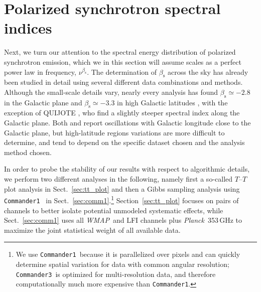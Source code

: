 \documentclass[twocolumn]{../../common/aa}
\def\WMAP{\emph{WMAP}}
\def\Planck{\emph{Planck}}
\def\commanderone{\texttt{Commander1}}
\def\commanderthree{\texttt{Commander3}}
\begin{document}
\section{Polarized synchrotron spectral indices}
\label{sec:specvar}

Next, we turn our attention to the spectral energy distribution of polarized synchrotron emission, which we in this section will assume scales as a perfect power law in frequency, $\nu^{\beta_{\mathrm{s}}}$. The determination of $\beta_{\mathrm{s}}$ across the sky has already been studied in detail using several different data combinations and methods. Although the small-scale details vary, nearly every analysis has found $\beta_\mathrm s\simeq-2.8$ in the Galactic plane and $\beta_\mathrm s\simeq-3.3$ in high Galactic latitudes \citep{fuskeland2014,krachmalnicoff2018,fuskeland:2019,weiland:2022}, with the exception of QUIJOTE \citep{QUIJOTE_IV,QUIJOTE_VIII}, who find a slightly steeper spectral index along the Galactic plane.
Both \citet{fuskeland2014} and \citet{weiland:2022} report oscillations with Galactic longitude close to the Galactic plane, but high-latitude regions variations are more difficult to determine, and tend to depend on the specific dataset chosen and the analysis method chosen.


In order to probe the stability of our results with respect to algorithmic details, we perform two different analyses in the following, namely first a so-called $T$--$T$ plot analysis in Sect.~\ref{sec:tt_plot} and then a Gibbs sampling analysis using \commanderone\ \citep{eriksen2008} in Sect.~\ref{sec:comm1}.\footnote{We use \commanderone\ because it is parallelized over pixels and can quickly determine spatial variation for data with common angular resolution; \commanderthree\ is optimized for multi-resolution data, and therefore computationally much more expensive than \commanderone.} Section~\ref{sec:tt_plot} focuses on pairs of channels to better isolate potential unmodeled systematic effects, while Sect.~\ref{sec:comm1} uses all \WMAP\ and LFI channels plus \Planck\ 353\,GHz to maximize the joint statistical weight of all available data.
\end{document}
